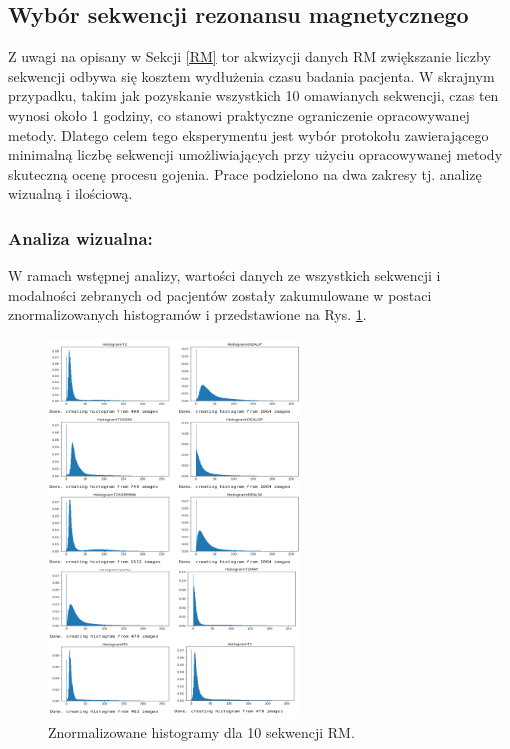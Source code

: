 \subsection{Wybór sekwencji rezonansu magnetycznego}

Z uwagi na opisany w Sekcji \ref{RM} tor akwizycji danych RM zwiększanie liczby sekwencji odbywa się kosztem wydłużenia czasu badania pacjenta. W skrajnym przypadku, takim jak pozyskanie wszystkich 10 omawianych sekwencji, czas ten wynosi około 1 godziny, co stanowi praktyczne ograniczenie opracowywanej metody. Dlatego celem tego eksperymentu jest wybór protokołu zawierającego minimalną liczbę sekwencji umożliwiających przy użyciu opracowywanej metody skuteczną ocenę procesu gojenia. Prace podzielono na dwa zakresy tj. analizę wizualną i ilościową.

\subsubsection{Analiza wizualna:} W ramach wstępnej analizy, wartości danych ze wszystkich sekwencji i modalności zebranych od pacjentów zostały zakumulowane w postaci znormalizowanych histogramów i przedstawione na Rys. \ref{fig:Hists}.

\begin{figure}[h]
	\centering
	\includegraphics[width=0.6\textwidth]{figures/Hists.png}
	\caption{Znormalizowane histogramy dla 10 sekwencji RM.}\label{fig:Hists}
\end{figure}

